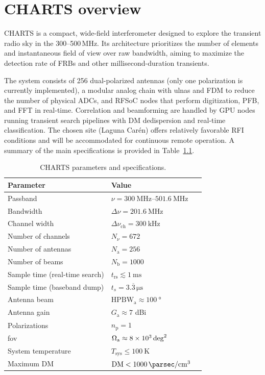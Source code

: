 \chapter{CHARTS overview}
CHARTS is a compact, wide-field interferometer designed to explore the transient radio sky in the 300--500\,MHz. Its architecture prioritizes the number of elements and instantaneous field of view over raw bandwidth, aiming to maximize the detection rate of FRBs and other millisecond-duration transients.

The system consists of 256 dual-polarized antennas (only one polarization is currently implemented), a modular analog chain with \glspl{ulna} and FDM to reduce the number of physical ADCs, and RFSoC nodes that perform digitization, PFB, and FFT in real-time. Correlation and beamforming are handled by GPU nodes running transient search pipelines with DM dedispersion and real-time classification. The chosen site (Laguna Carén) offers relatively favorable RFI conditions and will be accommodated for continuous remote operation. A summary of the main specifications is provided in Table~\ref{tab:charts_specifications}.

\begin{table}[t]
        \centering
        \caption{CHARTS parameters and specifications.}
        \begin{tabular}{lll}
        \hline
        \textbf{Parameter} & \textbf{Value} \\ \hline
        Passband & $\nu=\qtyrange{300}{501.6}{\mega\hertz}$ \\
        Bandwidth & $\Delta\nu=\qty{201.6}{\mega\hertz}$ \\
        Channel width & $\Delta\nu_\text{ch}=\qty{300}{\kilo\hertz}$ \\
        Number of channels & $N_\nu=\num{672}$ \\
        Number of antennas & $N_\text{a}=\num{256}$ \\
        Number of beams & $N_\text{b}=\num{1000}$ \\
        Sample time (real-time search) & $t_\text{rs}\lesssim\qty{1}{\milli\s}$ \\
        Sample time (baseband dump) & $t_s=3.\overline{3}\,\unit{\micro\second}$ \\
        Antenna beam & $\text{HPBW}_\text{a}\approx\qty{100}{\degree}$ \\
        Antenna gain & $G_\text{a}\approx\num{7}$ dBi \\
        Polarizations  & $n_\text{p}=\num{1}$\\
        \Gls{fov} & $\Omega_\text{a}\approx\qty{8e3}{deg\squared}$ \\ 
        System temperature & $T_\text{sys}\leq\qty{100}{\kelvin}$ \\
        Maximum DM & $\text{DM} < \qty{1000}{\parsec\per\centi\m\cubed}$ \\
        \hline
        \end{tabular}
        \label{tab:charts_specifications}
\end{table}


